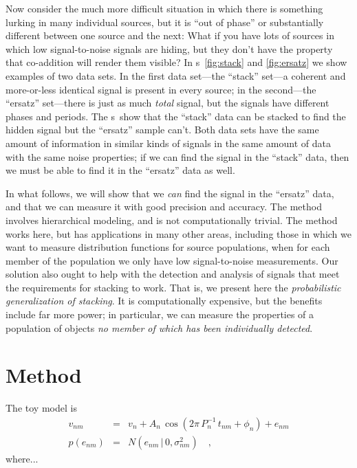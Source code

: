 \documentclass[12pt]{article}
\newcommand{\figurenames}{\figurename s}
\newcommand{\given}{\,|\,}
\newcommand{\amp}{A}
\newcommand{\period}{P}
\newcommand{\phase}{\phi}
\newcommand{\normal}{N}
\begin{document}
Now consider the much more difficult situation in which there is something lurking
in many individual sources, but it is ``out of phase'' or substantially different
between one source and the next:
What if you have lots of sources in which low signal-to-noise signals are hiding, but
they don't have the property that co-addition will render them visible?
In \figurenames~\ref{fig:stack} and \ref{fig:ersatz} we show examples of two data
sets.
In the first data set---the ``stack'' set---a coherent and more-or-less identical
signal is present in every source; in the second---the ``ersatz'' set---there is
just as much \emph{total} signal, but the signals have different phases and periods.
The \figurenames\ show that the ``stack'' data can be stacked to find the hidden
signal but the ``ersatz'' sample can't.
Both data sets have the same amount of information in similar kinds of signals
in the same amount of data with the same noise properties; if we can find the signal
in the ``stack'' data, then we must be able to find it in the ``ersatz'' data as
well.

In what follows, we will show that we \emph{can} find the signal in the ``ersatz''
data, and that we can measure it with good precision and accuracy.
The method involves hierarchical modeling, and is not computationally trivial.
The method works here, but has applications in many other areas, including those
in which we want to measure distribution functions for source populations, when for
each member of the population we only have low signal-to-noise measurements.
Our solution also ought to help with the detection and analysis of signals that
meet the requirements for stacking to work.
That is, we present here the \emph{probabilistic generalization of stacking}.
It is computationally expensive, but the benefits include far more power;
in particular, we can measure the properties of a population of objects
\emph{no member of which has been individually detected}.

\section{Method}

The toy model is
\begin{eqnarray}
v_{nm}
  &=&
v_n + \amp_n\,\cos(2\pi\,\period_n^{-1}\,t_{nm} + \phase_n) + e_{nm}
\\
p(e_{nm})
  &=&
\normal(e_{nm}\given 0,\sigma_{nm}^2)
\quad,
\end{eqnarray}
where...
\end{document}
